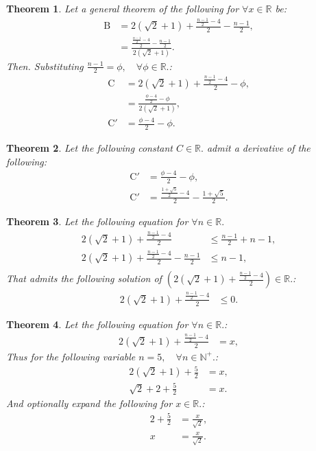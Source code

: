 \documentclass[10pt]{article}
\theoremstyle{plain}
\newtheorem{theorem}{Theorem}[section]
\theoremstyle{definition}
\theoremstyle{remark}
\begin{document}
\begin{theorem}
	Let a general theorem of the following for $\forall x \in \mathbb{R}$ be:
	\begin{align*}
		\mathrm{B} &= 2(\sqrt{2} + 1) + \frac{\frac{n - 1}{2} - 4}{2} - \frac{n - 1}{2},\\
		&= \frac{\frac{\frac{n - 1}{2} - 4}{2} - \frac{n - 1}{2}}{2(\sqrt{2} + 1)}.
	\end{align*}
	Then. Substituting $\frac{n - 1}{2}=\phi, \quad \forall \phi \in \mathbb{R}.$:
	\begin{align*}
		\mathrm{C} &= 2(\sqrt{2} + 1) + \frac{\frac{n - 1}{2} - 4}{2} - \phi,\\
		&= \frac{\frac{\phi - 4}{2} - \phi}{2(\sqrt{2} + 1)},\\
		\mathrm{C}' &= \frac{\phi - 4}{2} - \phi.
	\end{align*}
\end{theorem}

\begin{theorem}
	Let the following constant $C \in \mathbb{R}.$ admit a derivative of the following:
	\begin{align*}
		\mathrm{C}' &= \frac{\phi - 4}{2} - \phi,\\
		\mathrm{C}' &= \frac{\frac{1+\sqrt{5}}{2} - 4}{2} - \frac{1+\sqrt{5}}{2}.
	\end{align*}
\end{theorem}

\begin{theorem}
	Let the following equation for $\forall n \in \mathbb{R}.$
	\begin{align*}
		2(\sqrt{2} + 1) + \frac{\frac{n - 1}{2} - 4}{2}  &\leq \frac{n - 1}{2} + n - 1,\\
		2(\sqrt{2} + 1) + \frac{\frac{n - 1}{2} - 4}{2} - \frac{n - 1}{2} &\leq n - 1,\\
	\end{align*}
	 That admits the following solution of $(2(\sqrt{2} + 1) + \frac{\frac{n - 1}{2} - 4}{2}) \in \mathbb{R}.$:
	\begin{align*}
	 	2(\sqrt{2} + 1) + \frac{\frac{n - 1}{2} - 4}{2} &\leq 0.
	\end{align*}
\end{theorem}

\begin{theorem}
	Let the following equation for $\forall n \in \mathbb{R}.$:
	\begin{align*}
		2(\sqrt{2} + 1) + \frac{\frac{n - 1}{2} - 4}{2} &= x,
	\end{align*}
	Thus for the following variable $n=5, \quad \forall n \in \mathbb{N}^{+}.$:
	\begin{align*}
		2(\sqrt{2} + 1) + \frac{5}{2} &= x,\\
		\sqrt{2}+2 + \frac{5}{2} &= x.
	\end{align*}
	And optionally expand the following for $x \in \mathbb{R}.$:
	\begin{align*}
		2+\frac{5}{2} &= \frac{x}{\sqrt{2}},\\
		x &= \frac{x}{\sqrt{2}}.
	\end{align*}
\end{theorem}
\end{document}

